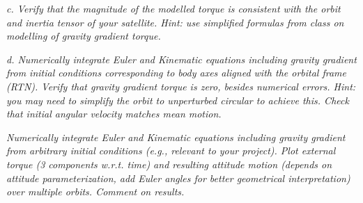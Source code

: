 \textit{c. Verify that the magnitude of the modelled torque is consistent with the orbit and inertia tensor of your satellite. Hint: use simplified formulas from class on modelling of gravity gradient torque.}

\textit{d. Numerically integrate Euler and Kinematic equations including gravity gradient from initial conditions corresponding to body axes aligned with the orbital frame (RTN). Verify that gravity gradient torque is zero, besides numerical errors. Hint: you may need to simplify the orbit to unperturbed circular to achieve this. Check that initial angular velocity matches mean motion.}

\textit{Numerically integrate Euler and Kinematic equations including gravity gradient from arbitrary initial conditions (e.g., relevant to your project). Plot external torque (3 components w.r.t. time) and resulting attitude motion (depends on attitude parameterization, add Euler angles for better geometrical interpretation) over multiple orbits. Comment on results.}